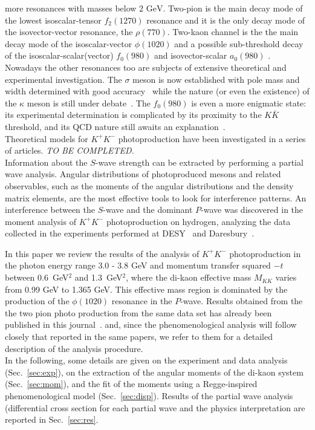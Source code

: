 \documentclass[twocolumn,superscriptaddress,prd]{revtex4}
\begin{document}
more resonances with masses below $2\mbox{ GeV}$. 
Two-pion is the main decay mode of the  lowest isoscalar-tensor $f_2(1270)$ resonance and it is 
the only decay mode of the isovector-vector resonance, the $\rho(770)$. 
Two-kaon channel is the the main decay mode of the isoscalar-vector $\phi(1020)$
and a possible sub-threshold decay of the isoscalar-scalar(vector) $f_0(980)$ and  isovector-scalar $a_0(980)$ .
Nowadays the other resonances too are subjects of  extensive theoretical and experimental investigation.
The $\sigma$ meson is now established
with  pole mass and width determined with good accuracy~\cite{Caprini:2005zr,Kaminski:2006qe,Kaminski:2006yv} while 
the nature (or even the existence) of the $\kappa$ meson is still under debate~\cite{kappa}.
The $f_0(980)$ is even a  more enigmatic state: its experimental determination is  complicated by its proximity to the $K{\bar K}$ threshold,
and its  QCD nature still awaits an explanation~\cite{Bugg:2004xu}.\\
Theoretical models for  $K^+K^-$ photoproduction have been investigated in a series of articles. 
{\it TO BE COMPLETED.}\\
Information about the $S$-wave strength can be extracted 
by performing a partial wave analysis.
Angular distributions of photoproduced mesons and related observables, such as the  moments of the angular distributions
 and  the density matrix elements,  are the most effective tools
to look for interference patterns. 
An interference between the $S$-wave and the dominant $P$-wave
was discovered in  the moment analysis of $K^+K^-$ photoproduction on hydrogen, analyzing the data collected 
in the experiments performed at DESY~\cite{Behrend} 
and Daresbury~\cite{Barber}.

In this paper we review the results of the analysis of 
 $K^+K^-$ photoproduction in the photon energy range 3.0 - 3.8 GeV and momentum transfer 
squared $-t$  between 0.6~GeV$^2$ and 1.3~GeV$^2$, where
the di-kaon effective mass $M_{KK}$ varies from 0.99 GeV to  1.365 GeV. 
This effective mass region is dominated by the production of the $\phi(1020)$ resonance in the $P$-wave. 
Results obtained from the the two pion photo production from the same data set  has already been published in this journal~\cite{f0-clas,2pi-clas}.
and, since the phenomenological analysis will follow closely that reported in the same papers, we refer to them for a detailed description of the analysis procedure.\\
In the following, some details are given on the experiment and data analysis (Sec.~\ref{sec:exp}),
on the extraction of the angular moments of the di-kaon system (Sec.~\ref{sec:mom}), and the 
fit of the moments using a Regge-inspired phenomenological model (Sec.~\ref{sec:disp}).
Results of the partial wave analysis (differential cross section for each partial wave
and the physics interpretation are reported in Sec.~\ref{sec:res}.
\end{document}
